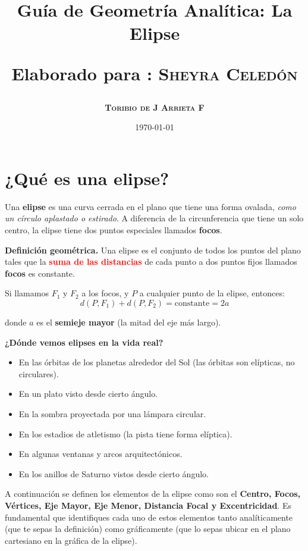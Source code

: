 \documentclass[12pt,a4paper]{article}
\title{\Large Guía de Geometría Analítica: La Elipse

\small{Elaborado para : \textsc{\bf{Sheyra Celedón}}}}
\author{\bf{\textsc{Toribio de J Arrieta F}}}
\date{\today}
\begin{document}
	\maketitle

	\section{¿Qué es una elipse?}

	Una \textbf{elipse} es una curva cerrada en el plano que tiene una forma ovalada, \emph{como un círculo aplastado o estirado}. A diferencia de la circunferencia que tiene un solo centro, la elipse tiene dos puntos especiales llamados \textbf{focos}.

	\bigskip

	\textbf{Definición geométrica.} Una elipse es el conjunto de todos los puntos del plano tales que la \textcolor{red}{\textbf{suma de las distancias}} de cada punto a dos puntos fijos llamados \textbf{focos} es constante.

	\bigskip

	Si llamamos $F_1$ y $F_2$ a los focos, y $P$ a cualquier punto de la elipse, entonces:
	\[
	d(P,F_1)+d(P,F_2)=\text{constante}=2a
	\]

	donde $a$ es el \textbf{semieje mayor} (la mitad del eje más largo).

	\bigskip

	\textbf{¿Dónde vemos elipses en la vida real?}
	\begin{itemize}
		\item En las órbitas de los planetas alrededor del Sol (las órbitas son elípticas, no circulares).
		\item En un plato visto desde cierto ángulo.
		\item En la sombra proyectada por una lámpara circular.
		\item En los estadios de atletismo (la pista tiene forma elíptica).
		\item En algunas ventanas y arcos arquitectónicos.
		\item En los anillos de Saturno vistos desde cierto ángulo.
	\end{itemize}

	\bigskip

	A continuación se definen los elementos de la elipse como son el \textbf{Centro, Focos, Vértices, Eje Mayor, Eje Menor, Distancia Focal y Excentricidad}. Es fundamental que identifiques cada uno de estos elementos tanto analíticamente (que te sepas la definición) como gráficamente (que lo sepas ubicar en el plano cartesiano en la gráfica de la elipse).
\end{document}
